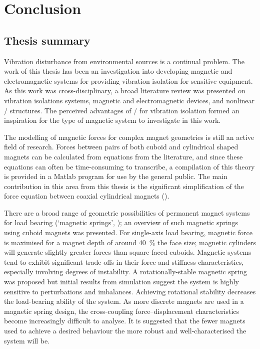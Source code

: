 \documentclass[10pt,a4paper]{memoir}
\begin{document}
\chapter{Conclusion}


\section{Thesis summary}

Vibration disturbance from environmental sources is a continual problem.
The work of this thesis has been an investigation into developing magnetic and electromagnetic systems for providing vibration isolation for sensitive equipment.
As this work was cross-disciplinary, a broad literature review was presented on vibration isolations systems, magnetic and electromagnetic devices, and nonlinear \qzs/ structures.
The perceived advantages of \qzs/ for vibration isolation formed an inspiration for the type of magnetic system to investigate in this work.

The modelling of magnetic forces for complex magnet geometries is still an active field of research.
Forces between pairs of both cuboid and cylindrical shaped magnets can be calculated from equations from the literature, and since these equations can often be time-consuming to transcribe, a compilation of this theory is provided in a Matlab program for use by the general public.
The main contribution in this area from this thesis is the significant simplification of the force equation between coaxial cylindrical magnets ().

There are a broad range of geometric possibilities of permanent magnet systems for load bearing (`magnetic springs', ); an overview of such magnetic springs using cuboid magnets was presented.
For single-axis load bearing, magnetic force is maximised for a magnet depth of around \SI{40}{\%} the face size; magnetic cylinders will generate slightly greater forces than square-faced cuboids.
Magnetic systems tend to exhibit significant trade-offs in their force and stiffness characteristics, especially involving degrees of instability.
A rotationally-stable magnetic spring was proposed but initial results from simulation suggest the system is highly sensitive to perturbations and imbalances.
Achieving rotational stability decreases the load-bearing ability of the system.
As more discrete magnets are used in a magnetic spring design, the cross-coupling force--displacement characteristics become increasingly difficult to analyse.
It is suggested that the fewer magnets used to achieve a desired behaviour the more robust and well-characterised the system will be.
\end{document}
